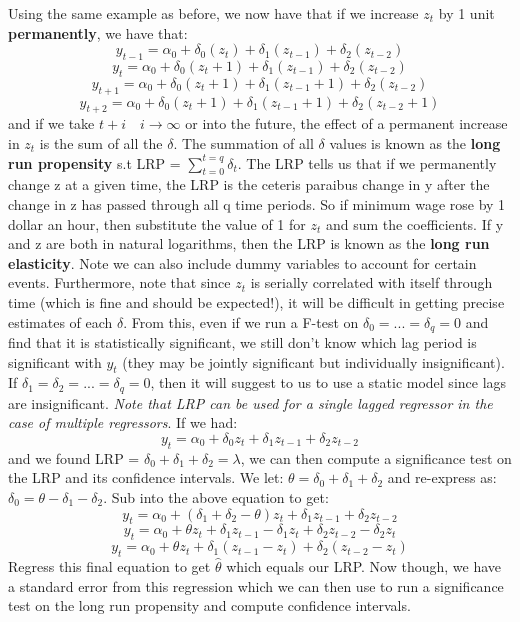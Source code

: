 \documentclass[11pt, oneside]{article}
\theoremstyle{definition}
\begin{document}
Using the same example as before, we now have that if we increase $z_t$ by 1 unit \textbf{permanently}, we have that:
$$
y_{t-1} = \alpha_0 + \delta_0 (z_t) + \delta_1 (z_{t-1}) + \delta_2(z_{t-2})
$$
$$
y_{t} = \alpha_0 + \delta_0 (z_t+1) + \delta_1 (z_{t-1}) + \delta_2(z_{t-2})
$$
$$
y_{t+1} = \alpha_0 + \delta_0 (z_t+1) + \delta_1 (z_{t-1}+1) + \delta_2(z_{t-2})
$$
$$
y_{t+2} = \alpha_0 + \delta_0 (z_t+1) + \delta_1 (z_{t-1}+1) + \delta_2(z_{t-2}+1)
$$
and if we take $t+i \quad i \rightarrow \infty$ or into the future, the effect of a permanent increase in $z_t$ is the sum of all the $\delta$. The summation of all $\delta$ values is known as the \textbf{long run propensity} s.t LRP = $\sum_{t=0}^{t=q}\delta_t$. The LRP tells us that if we permanently change z at a given time, the LRP is the ceteris paraibus change in y after the change in z has passed through all q time periods. So if minimum wage rose by 1 dollar an hour, then substitute the value of 1 for $z_{t}$ and sum the coefficients. If y and z are both in natural logarithms, then the LRP is known as the \textbf{long run elasticity}. Note we can also include dummy variables to account for certain events.
Furthermore, note that since $z_t$ is serially correlated with itself through time (which is fine and should be expected!), it will be difficult in getting precise estimates of each $\delta$. From this, even if we run a F-test on $\delta_0 =...=\delta_q =0$ and find that it is statistically significant, we still don't know which lag period is significant with $y_t$ (they may be jointly significant but individually insignificant). If $\delta_1 = \delta_2=...=\delta_q = 0$, then it will suggest to us to use a static model since lags are insignificant. \textit{Note that LRP can be used for a single lagged regressor in the case of multiple regressors}. If we had:
$$
y_t = \alpha_0 + \delta_0z_t + \delta_1z_{t-1} + \delta_2z_{t-2}
$$
and we found LRP = $\delta_0 + \delta_1 + \delta_2 = \lambda$, we can then compute a significance test on the LRP and its confidence intervals. We let: $\theta = \delta_0 + \delta_1 + \delta_2$ and re-express as: $\delta_0 = \theta - \delta_1 - \delta_2$. Sub into the above equation to get:
$$
y_t = \alpha_0 + (\delta_1 + \delta_2 - \theta)z_t + \delta_1z_{t-1} + \delta_2z_{t-2}
$$
$$
y_t = \alpha_0 + \theta z_t + \delta_1z_{t-1} - \delta_1z_t + \delta_2z_{t-2} - \delta_2z_t
$$
$$
y_t = \alpha_0 + \theta z_t + \delta_1(z_{t-1} - z_t) + \delta_2(z_{t-2} - z_{t})
$$
Regress this final equation to get $\hat{\theta}$ which equals our LRP. Now though, we have a standard error from this regression which we can then use to run a significance test on the long run propensity and compute confidence intervals.
\end{document}
